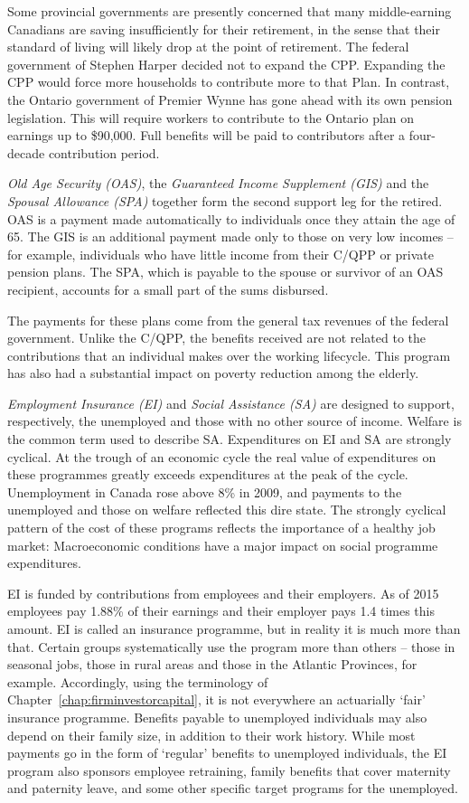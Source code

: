 Some provincial governments are presently concerned that many
middle-earning Canadians are saving insufficiently for their retirement, in
the sense that their standard of living will likely drop at the point of
retirement. The federal government of Stephen Harper decided not to expand
the CPP. Expanding the CPP would force more households to contribute more to
that Plan. In contrast, the Ontario government of Premier Wynne has gone
ahead with its own pension legislation. This will require workers to
contribute to the Ontario plan on earnings up to \$90,000. Full benefits
will be paid to contributors after a four-decade contribution period.  

\textit{Old Age Security (OAS)}, the \textit{Guaranteed Income
	Supplement (GIS)} and the \textit{Spousal Allowance (SPA)} together
form the second support leg for the retired. OAS is a payment made
automatically to individuals once they attain the age of 65. The GIS is an
additional payment made only to those on very low incomes -- for example,
individuals who have little income from their C/QPP or private pension
plans. The SPA, which is payable to the spouse or survivor of an OAS
recipient, accounts for a small part of the sums disbursed.

\newhtmlpage

The payments for these plans come from the general tax revenues of the
federal government. Unlike the C/QPP, the benefits received are not related
to the contributions that an individual makes over the working lifecycle.
This program has also had a substantial impact on poverty reduction among
the elderly.

\textit{Employment Insurance (EI)} and \textit{Social Assistance (SA)} 
are designed to support, respectively, the unemployed and those with no
other source of income. Welfare is the common term used to describe SA.
Expenditures on EI and SA are strongly cyclical. At the trough of an
economic cycle the real value of expenditures on these programmes greatly
exceeds expenditures at the peak of the cycle. Unemployment in Canada rose
above 8\% in 2009, and payments to the unemployed and those on welfare
reflected this dire state. The strongly cyclical pattern of the cost of
these programs reflects the importance of a healthy job market:
Macroeconomic conditions have a major impact on social programme
expenditures.

EI is funded by contributions from employees and their employers. As of 2015
employees pay 1.88\% of their earnings and their employer pays 1.4 times
this amount. EI is called an insurance programme, but in reality it is much
more than that. Certain groups systematically use the program more than
others -- those in seasonal jobs, those in rural areas and those in the
Atlantic Provinces, for example. Accordingly, using the terminology of
Chapter~\ref{chap:firminvestorcapital}, it is not everywhere an actuarially
`fair' insurance programme. Benefits payable to unemployed individuals may
also depend on their family size, in addition to their work history. While
most payments go in the form of `regular' benefits to unemployed
individuals, the EI program also sponsors employee retraining, family
benefits that cover maternity and paternity leave, and some other specific
target programs for the unemployed.

